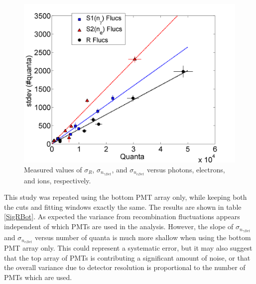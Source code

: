 \documentclass[a4paper,12pt]{article}
\begin{document}
{\begin{figure}[H]
\centering
\includegraphics[scale=0.5]{QuantaFluctuations.png}
\caption{Measured values of $\sigma_{R}$, $\sigma_{n_{\gamma Det}}$, and $\sigma_{n_{e Det}}$ versus photons, electrons, and ions, respectively.}
\label{QuantaFluc}
\end{figure}

This study was repeated using the bottom PMT array only, while keeping both the cuts and fitting windows exactly the same.  The results are shown in table \ref{SigRBot}.  As expected the variance from recombination fluctuations appears independent of which PMTs are used in the analysis.  However, the slope of $\sigma_{n_{\gamma Det}}$ and $\sigma_{n_{e Det}}$ versus number of quanta is much more shallow when using the bottom PMT array only.  This could represent a systematic error, but it may also suggest that the top array of PMTs is contributing a significant amount of noise, or that the overall variance due to detector resolution is proportional to the number of PMTs which are used.  

}
\end{document}
